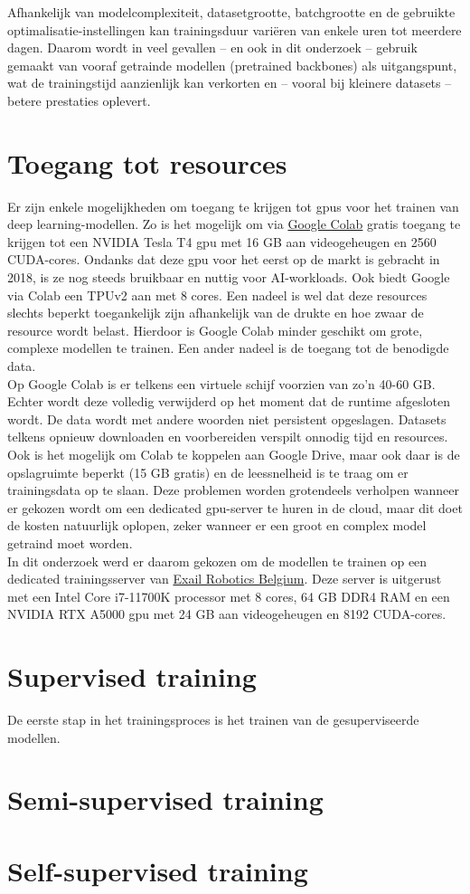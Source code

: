 Afhankelijk van modelcomplexiteit, datasetgrootte, batchgrootte en de gebruikte optimalisatie-instellingen kan trainingsduur variëren van enkele uren tot meerdere dagen. Daarom wordt in veel gevallen -- en ook in dit onderzoek -- gebruik gemaakt van vooraf getrainde modellen (pretrained backbones) als uitgangspunt, wat de trainingstijd aanzienlijk kan verkorten en -- vooral bij kleinere datasets -- betere prestaties oplevert. \\

\section{Toegang tot resources}

Er zijn enkele mogelijkheden om toegang te krijgen tot \glspl{gpu} voor het trainen van deep learning-modellen. Zo is het mogelijk om via \href{https://colab.research.google.com/}{Google Colab} gratis toegang te krijgen tot een NVIDIA Tesla T4 \gls{gpu} met 16 GB aan videogeheugen en 2560 CUDA-cores. \autocite{TechPowerUp_Tesla-T4} Ondanks dat deze \gls{gpu} voor het eerst op de markt is gebracht in 2018, is ze nog steeds bruikbaar en nuttig voor AI-workloads. Ook biedt Google via Colab een TPUv2 aan met 8 cores. Een nadeel is wel dat deze resources slechts beperkt toegankelijk zijn afhankelijk van de drukte en hoe zwaar de resource wordt belast. Hierdoor is Google Colab minder geschikt om grote, complexe modellen te trainen. Een ander nadeel is de toegang tot de benodigde data. \\

Op Google Colab is er telkens een virtuele schijf voorzien van zo'n 40-60 GB. Echter wordt deze volledig verwijderd op het moment dat de runtime afgesloten wordt. De data wordt met andere woorden niet persistent opgeslagen. Datasets telkens opnieuw downloaden en voorbereiden verspilt onnodig tijd en resources. Ook is het mogelijk om Colab te koppelen aan Google Drive, maar ook daar is de opslagruimte beperkt (15 GB gratis) en de leessnelheid is te traag om er trainingsdata op te slaan. Deze problemen worden grotendeels verholpen wanneer er gekozen wordt om een dedicated \gls{gpu}-server te huren in de cloud, maar dit doet de kosten natuurlijk oplopen, zeker wanneer er een groot en complex model getraind moet worden. \\

In dit onderzoek werd er daarom gekozen om de modellen te trainen op een dedicated trainingsserver van \href{https://www.exail.com/}{Exail Robotics Belgium}. Deze server is uitgerust met een Intel Core i7-11700K processor met 8 cores, 64 GB DDR4 RAM en een NVIDIA RTX A5000 \gls{gpu} met 24 GB aan videogeheugen en 8192 CUDA-cores. \autocite{TechPowerUp_RTX-A5000}

\section{Supervised training}

De eerste stap in het trainingsproces is het trainen van de gesuperviseerde modellen. 

\section{Semi-supervised training}

\section{Self-supervised training}